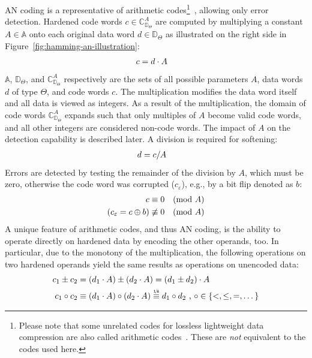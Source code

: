 AN coding is a representative of arithmetic codes\footnote{Please note that some unrelated codes for lossless lightweight data compression are also called arithmetic codes~\cite{DBLP:journals/cacm/WittenNC87}. These are \emph{not} equivalent to the codes used here.}~\cite{DBLP:journals/tc/Avizienis71,DBLP:conf/hase/HoffmannUDSLS14}, allowing only error detection. Hardened code words \(c\in\mathbb{C}_{\mathbb{D}_\Theta}^A\) are computed by multiplying a constant \(A\in\mathbb{A}\) onto each original data word \(d\in\mathbb{D}_\Theta\) as illustrated on the right side in Figure~\ref{fig:hamming-an-illustration}:
\vspace{-0.1cm}
 \begin{align}
c &= d \cdot A \label{eq:ANencode}
\vspace{-0.1cm}
\end{align}
\(\mathbb{A}\), \(\mathbb{D}_\Theta\), and \(\mathbb{C}_{\mathbb{D}_\Theta}^A\) respectively are the sets of all possible parameters \(A\), data words \(d\) of type \(\Theta\), and code words \(c\). The multiplication modifies the data word itself and all data is viewed as integers. As a result of the multiplication, the domain of code words \(\mathbb{C}_{\mathbb{D}_\Theta}^A\) expands such that only multiples of \(A\) become valid code words, and all other integers are considered non-code words. The impact of \(A\) on the detection capability is described later. A division is required for softening:
\vspace{-0.1cm}
\begin{align}
d &= c / A \label{eq:ANdecode}
\vspace{-0.1cm}
\end{align}
Errors are detected by testing the remainder of the division by \(A\), which must be zero, otherwise the code word was corrupted (\(c_\varepsilon\)), e.g., by a bit flip denoted as \(b\):
\vspace{-0.1cm}
\begin{align}
c &\equiv 0 \quad (\text{mod }A) \label{eq:ANcheck} \\
(c_\varepsilon = c \oplus b) &\not\equiv 0 \quad (\text{mod }A) \label{eq:ANcheckerror}
\end{align}
A unique feature of arithmetic codes, and thus AN coding, is the ability to operate directly on hardened data by encoding the other operands, too. In particular, due to the monotony of the multiplication, the following operations on two hardened operands yield the same results as operations on unencoded data:
\begin{align}
c_1 \pm c_2 & = (d_1 \cdot A) \pm (d_2 \cdot A) = (d_1 \pm d_2) \cdot A \label{eq:ANPlusMinus} \\
c_1 \circ c_2 & \equiv (d_1 \cdot A) \circ (d_2 \cdot A) \myequiv{\nicefrac[\texttt]{1}{A}} d_1 \circ d_2 \text{~,~} \circ\in\{<, \leq, =, \dots\} \label{eq:ANCompare}
\end{align}

